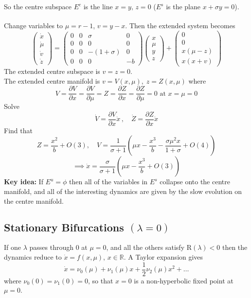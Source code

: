 \documentclass{article}
\newcommand{\pder}[2] {\frac{\partial {#1}}{\partial {#2} }}%
\begin{document}
So the centre subspace $E^c$ is the line $x=y, \, z=0$ ($E^s$ is the plane
$x + \sigma y=0$).
\\
\\
Change variables to $\mu = r-1$, $v=y-x$. Then the extended system becomes
\[ \left( \begin{array}{c} \dot{x} \\ \dot{\mu} \\ \dot{v} \\ \dot{z} \end{array} \right) =
%
\left( \begin{array}{cccr} 
0 & 0 & \sigma & 0 \\ 
0 & 0 & 0 & 0 \\ 
0 & 0 & -(1+\sigma) & 0 \\
0 & 0 & 0 & -b \end{array} \right) 
 \left( \begin{array}{c} x \\ \mu \\ y \\ z \end{array} \right) +
 \left( \begin{array}{c}
 0 \\ 0 \\
 x(\mu -z) \\ x(x+v) \end{array} \right) 
\]
The extended centre subspace is $v=z=0$.
\\
The extended centre manifold is $v= V(x,\mu), \; z = Z(x, \mu) $
where
\[ V = \pder{V}{x} = \pder{V}{\mu} = Z = \pder{Z}{x} = \pder{Z}{\mu} =0 \mbox{ 
at } x = \mu = 0 \]
Solve 
\[ \dot{V} = \pder{V}{x} \dot{x} \, , \quad \dot{Z} = \pder{Z}{x} \dot{x} \]
Find that
\[ Z = \frac{x^2}{b} + O(3) , \quad V = \frac{1}{\sigma+1}\left(\mu x - 
\frac{x^3}{b} - \frac{\sigma \mu ^2 x}{1+ \sigma} + O(4) \right) \]
\[ \implies \dot{x} = \frac{\sigma}{\sigma +1} \left( \mu x - \frac{x^3}{b} + 
O(3) \right) \]
\textbf{Key idea:} If $E^u = \phi$ then all of the variables in $E^s$ collapse
onto the centre manifold, and all of the interesting dynamics are given by
the slow evolution on the centre manifold.
%
%
\subsection{Stationary Bifurcations $(\lambda=0)$}
If one $\lambda$ passes through 0 at $\mu=0$, and all the others satisfy
R$(\lambda)<0$ then the dynamics reduce to $\dot{x} = f(x,\mu)$, 
$x \in \mathbb{R}$. A Taylor expansion gives
\[ \dot{x} = \nu_0(\mu) + \nu_1(\mu) x + \frac{1}{2} \nu_2 (\mu) x^2 + \dots \]
where $\nu_0(0) = \nu_1(0) = 0$, so that $x=0$ is a non-hyperbolic fixed point
at $\mu =0$.
\end{document}
